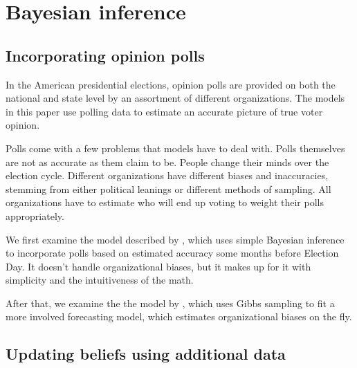 \documentclass[thesis.tex]{subfiles}
\begin{document}
\section{Bayesian inference}

\subsection{Incorporating opinion polls}

In the American presidential elections, opinion polls are provided on both the national and state level by an assortment of different organizations. The models in this paper use polling data to estimate an accurate picture of true voter opinion.

Polls come with a few problems that models have to deal with. Polls themselves are not as accurate as them claim to be. People change their minds over the election cycle. Different organizations have different biases and inaccuracies, stemming from either political leanings or different methods of sampling. All organizations have to estimate who will end up voting to weight their polls appropriately.

We first examine the model described by \cite{Lock:2010aa}, which uses simple Bayesian inference to incorporate polls based on estimated accuracy some months before Election Day. It doesn't handle organizational biases, but it makes up for it with simplicity and the intuitiveness of the math.

After that, we examine the the model by \cite{Strauss:2007aa}, which uses Gibbs sampling to fit a more involved forecasting model, which estimates organizational biases on the fly.

\begin{comment}
- problem: how accurate/useful are they? how many months before campaign (problems 
  with changing mind, making up mind, uncertainty about who will vote)

  (Lock)'s approach: Bayesian inference

  (Strauss): Gibbs

- problem: organization biases. empirically, political leanings, or different 
  methods of polling/sampling, guessing who will actually vote

  (Strauss) Gibbs
  Nate Silver: historical data
\end{comment}

\subsection{Updating beliefs using additional data}
\end{document}
